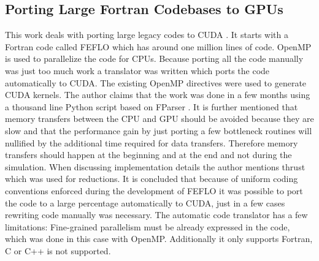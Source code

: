 \subsection{Porting Large Fortran Codebases to GPUs}
\label{sec:cudaPorting10}
This work deals with porting large legacy codes to CUDA \cite{portingCuda10}. It starts with a Fortran code called FEFLO which has around one million lines of code. OpenMP is used to parallelize the code for CPUs. Because porting all the code manually was just too much work a translator was written which ports the code automatically to CUDA. The existing OpenMP directives were used to generate CUDA kernels. The author claims that the work was done in a few months using a thousand line Python script based on FParser \cite{fparser}. It is further mentioned that memory transfers between the CPU and GPU should be avoided because they are slow and that the performance gain by just porting a few bottleneck routines will nullified by the additional time required for data transfers. Therefore memory transfers should happen at the beginning and at the end and not during the simulation. When discussing implementation details the author mentions thrust \cite{thrust} which was used for reductions. It is concluded that because of uniform coding conventions enforced during the development of FEFLO it was possible to port the code to a large percentage automatically to CUDA, just in a few cases rewriting code manually was necessary. The automatic code translator has a few limitations: Fine-grained parallelism must be already expressed in the code, which was done in this case with OpenMP. Additionally it only supports Fortran, C or C++ is not supported.
